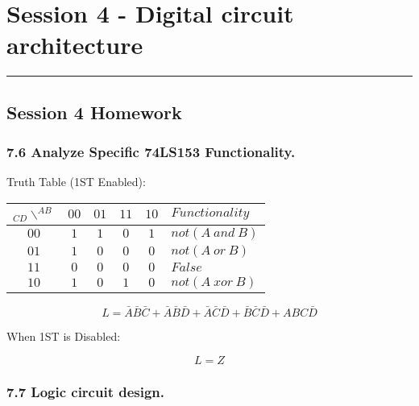 \section{Session 4 - Digital circuit architecture}
\vspace{-15pt}\noindent\rule{\textwidth}{0.1pt}\vspace{-10pt}
    \subsection*{Session 4 Homework}
    \subsubsection{7.6 \textnormal{Analyze Specific 74LS153 Functionality}.}
    {\color{hwSolution}
        Truth Table (1ST Enabled):
        \begin{center}
            \begin{tabular}{c|c c c c|l}
                $_{CD}\backslash^{AB}$ & $00$ & $01$ & $11$ & $10$ & $Functionality$\\
                \hline
                $00$ & $1$ & $1$ & $0$ & $1$ & $not(A~and~B)$   \\
                $01$ & $1$ & $0$ & $0$ & $0$ & $not(A~or~B)$    \\
                $11$ & $0$ & $0$ & $0$ & $0$ & $False$          \\
                $10$ & $1$ & $0$ & $1$ & $0$ & $not(A~xor~B)$    \\
            \end{tabular}
        \end{center}
            \[L = \bar{A}\bar{B}\bar{C}+ \bar{A}\bar{B}\bar{D} + \bar{A}\bar{C}\bar{D} + \bar{B}\bar{C}\bar{D} + ABC\bar{D} \]

        When 1ST is Disabled:
        
            \[L = Z\]
    }

    \subsubsection{7.7 \textnormal{Logic circuit design}.}

